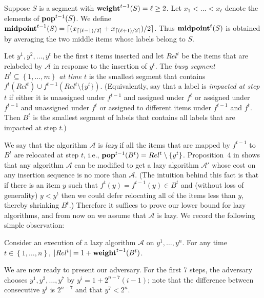 \documentclass[unicode,review]{siamart1116}
\newcommand{\A}{\mathcal{A}}
\newcommand{\natInt}[2]{ \left\{ #1, \dotsc, #2 \right\} }
\newcommand{\pop}{{\rm {\bf pop}}}
\newcommand{\weight}{{\rm {\bf weight}}}
\newcommand{\midp}{{\rm {\bf midpoint}}}
\numberwithin{theorem}{section}
\begin{document}

Suppose $S$ is a segment with $\weight^{t-1}(S)=\ell \geq 2$.  Let $x_1< \ldots < x_\ell$ denote the elements
of $\pop^{t-1}(S)$.  We define $\midp^{t-1}(S)= \lceil (x_{\lceil (\ell-1)/2 \rceil} + x_{\lceil (\ell+1)/2 \rceil} )/ 2 \rceil$. Thus $\midp^t(S)$ is obtained by averaging the two middle items whose labels belong to  $S$. 

Let $y^1,y^2,\dotsc,y^t$ be the first $t$ items inserted  and let $Rel^t$ be the items
that are relabeled by
$\A$ in response to the insertion of $y^t$. The \emph{busy segment $B^t\subseteq \natInt{1}{m}$ at time $t$} is
the smallest segment that contains $f^t(Rel^t)\cup f^{t-1}(Rel^t \setminus \{y^t\})$. 
 (Equivalently, say that a label
is {\em  impacted at step $t$} if either it is unassigned under $f^{t-1}$ and assigned under $f^t$ or assigned under
$f^{t-1}$ and unassigned under $f^t$ or assigned to different items under $f^{t-1}$ and $f^t$. Then $B^t$ is
the smallest segment  of labels that contains all labels that are impacted at step $t$.)

We say
 that the algorithm $\A$ is \emph{lazy} if
all the items that are mapped by $f^{t-1}$ to $B^t$ are relocated at step $t$, i.e., $\pop^{t-1}(B^t) = Rel^t \setminus \{y^t\}$.
Proposition~4 in \cite{BKS} shows that any algorithm $\A$ can be modified to get a lazy algorithm $\A'$
whose cost on any insertion sequence is no more than $\A$. 
(The intuition behind this fact is that if there is an item $y$
such that $f^t(y)=f^{t-1}(y) \in B^t$ and (without loss of generality) $y<y^t$ then we could defer relocating
all of the items less than $y$, thereby shrinking $B^t$.)
Therefore it suffices to prove our lower bound
for lazy algorithms, and from now on we assume that  $\A$ is lazy.
We record the following simple observation:

\begin{proposition}
\label{l-busy}
Consider an execution of a lazy algorithm $\A$ on $y^1,\ldots,y^n$.  
For any
time $t\in \natInt{1}{n}$, $|Rel^t|=1+\weight^{t-1}(B^t)$.
\end{proposition}



We are now ready to present our adversary.   For the first 7 steps, the adversary chooses
$y^1,y^2,\ldots,y^7$ by $y^i=1+2^{n-7}(i-1)$; note
that the difference between consecutive $y^i$ is $2^{n-7}$ and that $y^7 < 2^n$.
\end{document}
